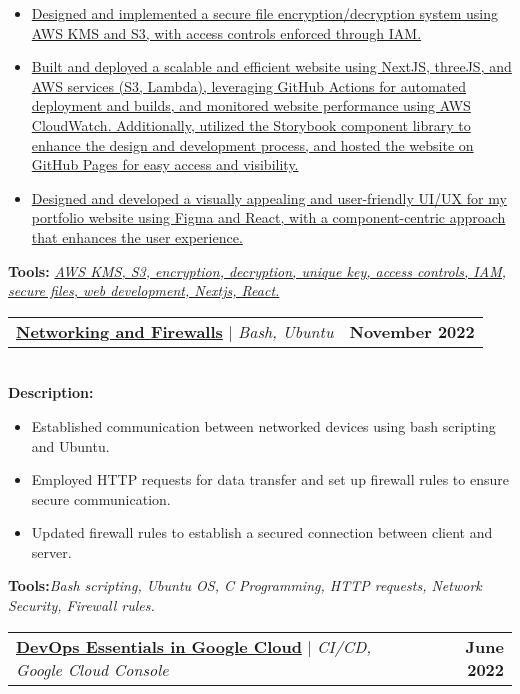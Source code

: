 \documentclass[letterpaper,11pt]{article}
\makeatletter
\newcommand{\resumeItem}[1]{
  \item\small{
    {#1 \vspace{-2pt}}
  }
}
\newcommand{\resumeProjectHeading}[2]{
    \item
    \begin{tabular*}{1.001\textwidth}{l@{\extracolsep{\fill}}r}
      \small#1 & \textbf{\small #2}\\
    \end{tabular*}\vspace{-7pt}
}
\newcommand{\resumeItemListStart}{\begin{itemize}}
\newcommand{\resumeItemListEnd}{\end{itemize}\vspace{-5pt}}
\makeatother
\begin{document}
          \vspace{-5pt}
          \resumeItemListStart
            \resumeItem{\href{https://yakkshit.com}{Designed and implemented a secure file encryption/decryption system using AWS KMS and S3, with access controls enforced through IAM.}}
            \resumeItem{\href{https://yakkshit.com}{Built and deployed a scalable and efficient website using NextJS, threeJS, and AWS services (S3, Lambda), leveraging GitHub Actions for automated deployment and builds, and monitored website performance using AWS CloudWatch. Additionally, utilized the Storybook component library to enhance the design and development process, and hosted the website on GitHub Pages for easy access and visibility.}}
            \resumeItem{\href{https://yakkshit.com}{Designed and developed a visually appealing and user-friendly UI/UX for my portfolio website using Figma and React, with a component-centric approach that enhances the user experience.}}
          \resumeItemListEnd
          \vspace{-2pt}
          \textbf{Tools:}\emph{ \href{https://yakkshit.com}{AWS KMS, S3, encryption, decryption, unique key, access controls, IAM, secure files, web development, Nextjs, React.}}
          \vspace{-18pt}
          \resumeProjectHeading
          {\textbf{\href{https://github.com/saiyakkshit?tab=repositories}{Networking and Firewalls}} $|$ \emph{Bash, Ubuntu}}{November 2022}\\
          \vspace{6pt}
          \textbf{Description:}
           \vspace{-5pt}
          \resumeItemListStart
            \resumeItem{Established communication between networked devices using bash scripting and Ubuntu.}
            \resumeItem{Employed HTTP requests for data transfer and set up firewall rules to ensure secure communication.}
            \resumeItem{Updated firewall rules to establish a secured connection between client and server.}           
          \resumeItemListEnd 
          \textbf{Tools:}\emph{Bash scripting,
Ubuntu OS,
C Programming,
HTTP requests, Network Security,
Firewall rules.}
          \vspace{-18pt}
          \resumeProjectHeading
          {\textbf{\href{https://www.cloudskillsboost.google/public_profiles/6bf05c97-e7a5-48b7-bd37-03938dae9743/badges/2357183}{DevOps Essentials in Google Cloud}} $|$ \emph{CI/CD, Google Cloud Console}}{June 2022}\\
          \vspace{6pt}
\end{document}
